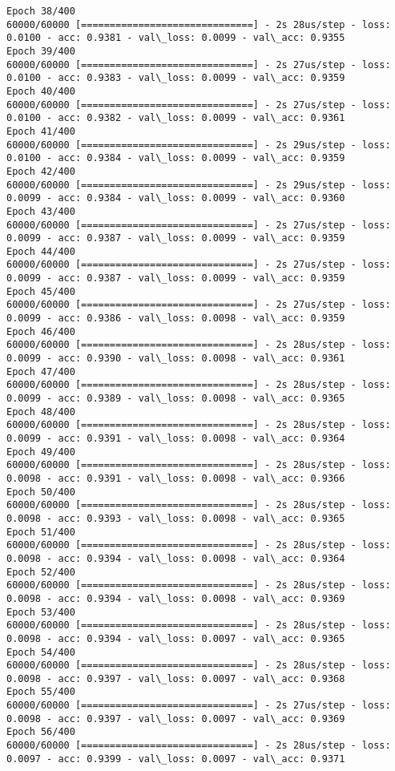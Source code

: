 \documentclass[11pt]{article}
\begin{document}
\begin{Verbatim}[commandchars=\\\{\}]
Epoch 38/400
60000/60000 [==============================] - 2s 28us/step - loss: 0.0100 - acc: 0.9381 - val\_loss: 0.0099 - val\_acc: 0.9355
Epoch 39/400
60000/60000 [==============================] - 2s 27us/step - loss: 0.0100 - acc: 0.9383 - val\_loss: 0.0099 - val\_acc: 0.9359
Epoch 40/400
60000/60000 [==============================] - 2s 27us/step - loss: 0.0100 - acc: 0.9382 - val\_loss: 0.0099 - val\_acc: 0.9361
Epoch 41/400
60000/60000 [==============================] - 2s 29us/step - loss: 0.0100 - acc: 0.9384 - val\_loss: 0.0099 - val\_acc: 0.9359
Epoch 42/400
60000/60000 [==============================] - 2s 29us/step - loss: 0.0099 - acc: 0.9384 - val\_loss: 0.0099 - val\_acc: 0.9360
Epoch 43/400
60000/60000 [==============================] - 2s 27us/step - loss: 0.0099 - acc: 0.9387 - val\_loss: 0.0099 - val\_acc: 0.9359
Epoch 44/400
60000/60000 [==============================] - 2s 27us/step - loss: 0.0099 - acc: 0.9387 - val\_loss: 0.0099 - val\_acc: 0.9359
Epoch 45/400
60000/60000 [==============================] - 2s 27us/step - loss: 0.0099 - acc: 0.9386 - val\_loss: 0.0098 - val\_acc: 0.9359
Epoch 46/400
60000/60000 [==============================] - 2s 28us/step - loss: 0.0099 - acc: 0.9390 - val\_loss: 0.0098 - val\_acc: 0.9361
Epoch 47/400
60000/60000 [==============================] - 2s 28us/step - loss: 0.0099 - acc: 0.9389 - val\_loss: 0.0098 - val\_acc: 0.9365
Epoch 48/400
60000/60000 [==============================] - 2s 28us/step - loss: 0.0099 - acc: 0.9391 - val\_loss: 0.0098 - val\_acc: 0.9364
Epoch 49/400
60000/60000 [==============================] - 2s 28us/step - loss: 0.0098 - acc: 0.9391 - val\_loss: 0.0098 - val\_acc: 0.9366
Epoch 50/400
60000/60000 [==============================] - 2s 28us/step - loss: 0.0098 - acc: 0.9393 - val\_loss: 0.0098 - val\_acc: 0.9365
Epoch 51/400
60000/60000 [==============================] - 2s 28us/step - loss: 0.0098 - acc: 0.9394 - val\_loss: 0.0098 - val\_acc: 0.9364
Epoch 52/400
60000/60000 [==============================] - 2s 28us/step - loss: 0.0098 - acc: 0.9394 - val\_loss: 0.0098 - val\_acc: 0.9369
Epoch 53/400
60000/60000 [==============================] - 2s 28us/step - loss: 0.0098 - acc: 0.9394 - val\_loss: 0.0097 - val\_acc: 0.9365
Epoch 54/400
60000/60000 [==============================] - 2s 28us/step - loss: 0.0098 - acc: 0.9397 - val\_loss: 0.0097 - val\_acc: 0.9368
Epoch 55/400
60000/60000 [==============================] - 2s 27us/step - loss: 0.0098 - acc: 0.9397 - val\_loss: 0.0097 - val\_acc: 0.9369
Epoch 56/400
60000/60000 [==============================] - 2s 28us/step - loss: 0.0097 - acc: 0.9399 - val\_loss: 0.0097 - val\_acc: 0.9371

\end{Verbatim}
\end{document}
